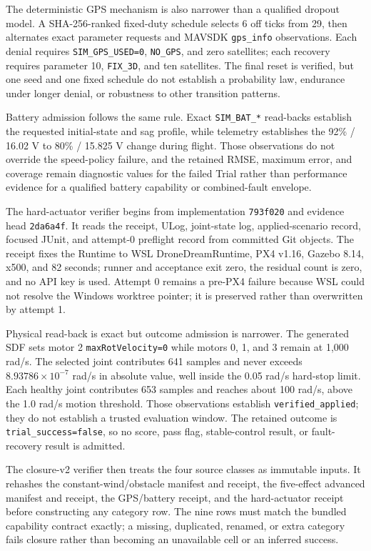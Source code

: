The deterministic GPS mechanism is also narrower than a qualified dropout
model. A SHA-256-ranked fixed-duty schedule selects 6 off ticks from 29,
then alternates exact parameter requests and MAVSDK \texttt{gps\_info}
observations. Each denial requires \texttt{SIM\_GPS\_USED=0},
\texttt{NO\_GPS}, and zero satellites; each recovery requires parameter 10,
\texttt{FIX\_3D}, and ten satellites. The final reset is verified, but one
seed and one fixed schedule do not establish a probability law, endurance
under longer denial, or robustness to other transition patterns.

Battery admission follows the same rule. Exact \texttt{SIM\_BAT\_*}
read-backs establish the requested initial-state and sag profile, while
telemetry establishes the 92\% / 16.02 V to 80\% / 15.825 V change during
flight. Those observations do not override the speed-policy failure, and
the retained RMSE, maximum error, and coverage remain diagnostic values for
the failed Trial rather than performance evidence for a qualified battery
capability or combined-fault envelope.

The hard-actuator verifier begins from implementation \texttt{793f020}
and evidence head \texttt{2da6a4f}. It reads the receipt, ULog,
joint-state log, applied-scenario record, focused JUnit, and attempt-0
preflight record from committed Git objects. The receipt fixes the Runtime
to WSL DroneDreamRuntime, PX4 v1.16, Gazebo 8.14, x500, and 82 seconds;
runner and acceptance exit zero, the residual count is zero, and no API
key is used. Attempt 0 remains a pre-PX4 failure because WSL could not
resolve the Windows worktree pointer; it is preserved rather than
overwritten by attempt 1.

Physical read-back is exact but outcome admission is narrower. The
generated SDF sets motor 2 \texttt{maxRotVelocity=0} while motors 0, 1,
and 3 remain at 1,000 rad/s. The selected joint contributes 641 samples
and never exceeds $8.93786\times10^{-7}$ rad/s in absolute value, well
inside the 0.05 rad/s hard-stop limit. Each healthy joint contributes 653
samples and reaches about 100 rad/s, above the 1.0 rad/s motion threshold.
Those observations establish \texttt{verified\_applied}; they do not
establish a trusted evaluation window. The retained outcome is
\texttt{trial\_success=false}, so no score, pass flag, stable-control
result, or fault-recovery result is admitted.

The closure-v2 verifier then treats the four source classes as immutable
inputs. It rehashes the constant-wind/obstacle manifest and receipt, the
five-effect advanced manifest and receipt, the GPS/battery receipt, and
the hard-actuator receipt before constructing any category row. The nine
rows must match the bundled capability contract exactly; a missing,
duplicated, renamed, or extra category fails closure rather than becoming
an unavailable cell or an inferred success.

